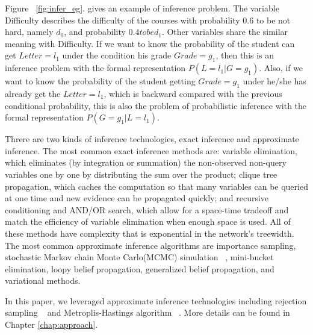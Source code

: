 Figure ~\ref{fig:infer_eg}. gives an example of inference problem. The variable Difficulty describes the difficulty of the courses with probability $0.6$ to be not hard, namely $d_0$, and probability $0.4 to be d_1$. Other variables share the similar meaning with Difficulty. If we want to know the probability of the student can get $Letter = l_1$ under the condition his grade $Grade = g_1$, then this is an inference problem with the formal representation $P (L = l_1 | G = g_1)$. Also, if we want to know the probability of the student getting $Grade = g_1$ under he/she has already get the $Letter = l_1$, which is backward compared with the previous conditional probability, this is also the problem of probabilistic inference with the formal representation $P (G = g_1 | L = l_1)$.

Threre are two kinds of inference technologies, exact inference and approximate inference. The most common exact inference methods are: variable elimination, which eliminates (by integration or summation) the non-observed non-query variables one by one by distributing the sum over the product; clique tree propagation, which caches the computation so that many variables can be queried at one time and new evidence can be propagated quickly; and recursive conditioning and AND/OR search, which allow for a space-time tradeoff and match the efficiency of variable elimination when enough space is used. All of these methods have complexity that is exponential in the network's treewidth. The most common approximate inference algorithms are importance sampling, stochastic Markov chain Monte Carlo(MCMC) simulation ~\cite{mcmc}, mini-bucket elimination, loopy belief propagation, generalized belief propagation, and variational methods.

In this paper, we leveraged approximate inference technologies including rejection sampling ~\cite{reject} and Metroplis-Hastings algorithm ~\cite{mh}. More details can be found in Chapter \ref{chap:approach}.

